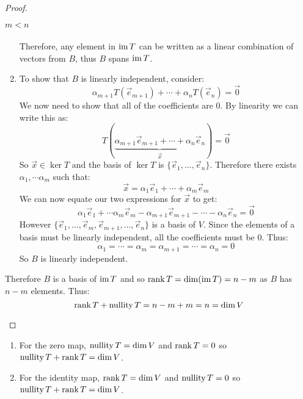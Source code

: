 \documentclass[../main.tex]{subfiles}
\begin{document}
\begin{proof}
\begin{proofcases}
\begin{case}{$m < n$}
\begin{enumerate}
\begin{align*}
      \end{align*}
      Therefore, any element in $\operatorname{im} T$ can be written as a linear combination of vectors from $B$, thus $B$ spans $\operatorname{im} T$.
      \item
      To show that $B$ is linearly independent, consider:
      \[
        \alpha_{m + 1} T(\vec{e}_{m+1}) + \cdots + \alpha_n T(\vec{e}_n) = \vec{0}
      \]
      We now need to show that all of the coefficients are 0.
      By linearity we can write this as:
      \[
        T(\underbrace{\alpha_{m + 1}\vec{e}_{m + 1} + \cdots + \alpha_n \vec{e}_n}_{\vec{x}}) = \vec{0}
      \]
      So $\vec{x} \in \ker T$ and the basis of $\ker T$ is $\{\vec{e}_1, \ldots, \vec{e}_n\}$.
      Therefore there exists $\alpha_1, \cdots \alpha_m$ such that:
      \[
        \vec{x} = \alpha_1 \vec{e}_1 + \cdots + \alpha_m \vec{e}_m
      \]
      We can now equate our two expressions for $\vec{x}$ to get:
      \[
        \alpha_1 \vec{e}_1 + \cdots \alpha_m \vec{e}_m - \alpha_{m + 1}\vec{e}_{m + 1} - \cdots - \alpha_n \vec{e}_n = \vec{0}
      \]
      However $\{\vec{e}_1, \ldots, \vec{e}_m, \vec{e}_{m + 1}, \ldots, \vec{e}_n\}$ is a basis of $V$.
      Since the elements of a basis must be linearly independent, all the coefficients must be 0.
      Thus:
      \[
        \alpha_1 = \cdots = \alpha_m = \alpha_{m + 1} = \cdots = \alpha_n = 0
      \]
      So $B$ is linearly independent.
    \end{enumerate}
    Therefore $B$ is a basis of $\operatorname{im} T$ and so $\operatorname{rank} T = \dim(\operatorname{im} T) = n - m$ as $B$ has $n - m$ elements.
    Thus:
    \[
      \operatorname{rank} T + \operatorname{nullity} T = n - m + m = n = \dim V
    \]
  \end{case}
\end{proofcases}
\end{proof}
\begin{example}
  \begin{enumerate}
    \item For the zero map, $\operatorname{nullity} T = \dim V$ and $\operatorname{rank} T = 0$ so $\operatorname{nullity} T + \operatorname{rank} T = \dim V$.
    \item For the identity map, $\operatorname{rank} T = \dim V$ and $\operatorname{nullity} T = 0$ so $\operatorname{nullity} T + \operatorname{rank} T = \dim V$.
  \end{enumerate}
\end{example}
\end{document}
